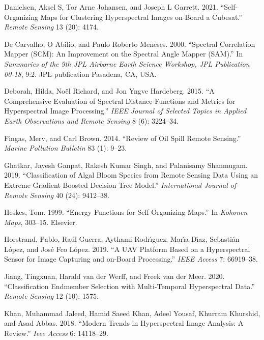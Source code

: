 \documentclass[
  letterpaper,
  DIV=11,
  numbers=noendperiod]{scrartcl}
\newlength{\cslhangindent}
\newenvironment{CSLReferences}[2] %
 {\begin{list}{}{%
  \setlength{\itemindent}{0pt}
  \setlength{\leftmargin}{0pt}
  \setlength{\parsep}{0pt}
  \ifodd #1
   \setlength{\leftmargin}{\cslhangindent}
   \setlength{\itemindent}{-1\cslhangindent}
  \fi
  \setlength{\itemsep}{#2\baselineskip}}}
 {\end{list}}
\begin{document}
\begin{CSLReferences}{1}{0}
Danielsen, Aksel S, Tor Arne Johansen, and Joseph L Garrett. 2021.
{``Self-Organizing Maps for Clustering Hyperspectral Images on-Board a
Cubesat.''} \emph{Remote Sensing} 13 (20): 4174.

De Carvalho, O Abilio, and Paulo Roberto Meneses. 2000. {``Spectral
Correlation Mapper (SCM): An Improvement on the Spectral Angle Mapper
(SAM).''} In \emph{Summaries of the 9th JPL Airborne Earth Science
Workshop, JPL Publication 00-18}, 9:2. JPL publication Pasadena, CA,
USA.

Deborah, Hilda, Noël Richard, and Jon Yngve Hardeberg. 2015. {``A
Comprehensive Evaluation of Spectral Distance Functions and Metrics for
Hyperspectral Image Processing.''} \emph{IEEE Journal of Selected Topics
in Applied Earth Observations and Remote Sensing} 8 (6): 3224--34.

Fingas, Merv, and Carl Brown. 2014. {``Review of Oil Spill Remote
Sensing.''} \emph{Marine Pollution Bulletin} 83 (1): 9--23.

Ghatkar, Jayesh Ganpat, Rakesh Kumar Singh, and Palanisamy Shanmugam.
2019. {``Classification of Algal Bloom Species from Remote Sensing Data
Using an Extreme Gradient Boosted Decision Tree Model.''}
\emph{International Journal of Remote Sensing} 40 (24): 9412--38.

Heskes, Tom. 1999. {``Energy Functions for Self-Organizing Maps.''} In
\emph{Kohonen Maps}, 303--15. Elsevier.

Horstrand, Pablo, Raúl Guerra, Aythami Rodrı́guez, Marı́a Dı́az, Sebastián
López, and José Fco López. 2019. {``A UAV Platform Based on a
Hyperspectral Sensor for Image Capturing and on-Board Processing.''}
\emph{IEEE Access} 7: 66919--38.

Jiang, Tingxuan, Harald van der Werff, and Freek van der Meer. 2020.
{``Classification Endmember Selection with Multi-Temporal Hyperspectral
Data.''} \emph{Remote Sensing} 12 (10): 1575.

Khan, Muhammad Jaleed, Hamid Saeed Khan, Adeel Yousaf, Khurram Khurshid,
and Asad Abbas. 2018. {``Modern Trends in Hyperspectral Image Analysis:
A Review.''} \emph{Ieee Access} 6: 14118--29.


\end{CSLReferences}
\end{document}
